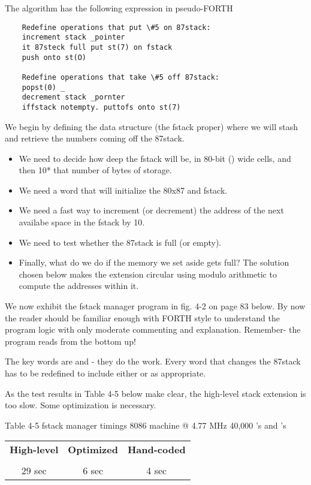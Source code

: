 The algorithm has the following expression in pseudo-FORTH

\begin{lstlisting}
    Redefine operations that put \#5 on 87stack:
    increment stack _pointer
    it 87steck full put st(7) on fstack
    push onto st(O)

    Redefine operations that take \#5 off 87stack:
    popst(0) _
    decrement stack _pornter
    iffstack notempty. puttofs onto st(7)
\end{lstlisting}

We begin by defining the data structure (the fstack proper) where we will stash and retrieve the numbers coming off the 87stack.

\begin{itemize}
    \item We need to decide how deep the fstack will be, in 80-bit () wide cells, and then  10* that number of bytes of storage.
    \item We need a word that will initialize the 80x87 and fstack.
    \item We need a fast way to increment (or decrement) the address of the next availabe space in the fstack by 10.
    \item We need to test whether the 87stack is full (or empty).
    \item Finally, what do we do if the memory we set aside gets full? The solution chosen below makes the extension circular using modulo arithmetic to compute the addresses within it.
\end{itemize}

We now exhibit the fstack manager program in fig. 4-2 on page 83 below. By now the reader should be familiar enough with FORTH style to understand the program logic with only moderate commenting and explanation. Remember- the program reads from the bottom up!

The key words are  and - they do the work. Every word that changes the 87stack has to be redefined to include either  or  as appropriate.

As the test results in Table 4-5 below make clear, the high-level stack extension is too slow. Some optimization is necessary.

Table 4-5 fstack manager timings
8086 machine @ 4.77 MHz
40,000 's and 's
\begin{center}
    \begin{tabular}{|c c c|}
    \hline
        \textbf{High-level} & \textbf{Optimized} & \textbf{Hand-coded} \\
        \\
        29 sec              & 6 sec              & 4 sec \\
    \hline
    \end{tabular}
\end{center}

